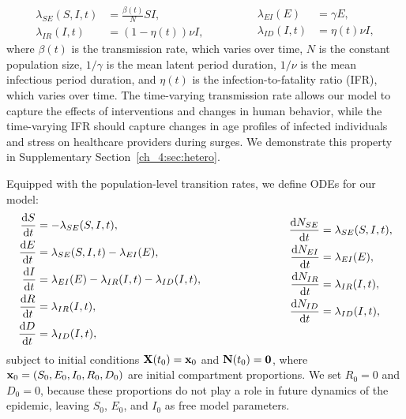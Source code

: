 \begin{equation}
\begin{aligned}
\lambda_{SE}(S, I, t) &= \frac{\beta(t)}{N} S I,\\
\lambda_{I R}(I, t) &= \left(1-\eta(t)\right) \nu I,
\end{aligned}
\qquad \quad \quad
\begin{aligned}
\lambda_{E I}(E) &= \gamma E,\\
\lambda_{I D}(I, t) &= \eta(t) \nu I,
\end{aligned}
\end{equation}
where $\beta(t)$ is the transmission rate, which varies over time, \( N \) is the constant population size, $1/\gamma$ is the mean latent period duration, $1/\nu$ is the mean infectious period duration, and $\eta(t)$ is the infection-to-fatality ratio (IFR), which varies over time.
The time-varying transmission rate allows our model to capture the effects of interventions and changes in human behavior, while the time-varying IFR should capture changes in age profiles of infected individuals and stress on healthcare providers during surges.
We demonstrate this property in Supplementary Section~\ref{ch_4:sec:hetero}.
\par
Equipped with the population-level transition rates, we define ODEs for our model:
\begin{equation}
\label{ch_4:eqn:model_ODEs}
\begin{aligned}
\frac{\mathrm{d} S}{\mathrm{d} t} &= -\lambda_{SE}(S, I, t),\\
\frac{\mathrm{d} E}{\mathrm{d} t} &= \lambda_{SE}(S, I, t)  - \lambda_{E I}(E),\\
\frac{\mathrm{d} I}{\mathrm{d} t} &=  \lambda_{E I}(E) - \lambda_{I R}(I, t) -  \lambda_{I D}(I, t),\\
\frac{\mathrm{d} R}{\mathrm{d} t} &=   \lambda_{I R}(I, t),\\
\frac{\mathrm{d} D}{\mathrm{d} t} &= \lambda_{I D}(I, t),
\end{aligned}
\qquad \qquad \qquad \qquad
\begin{aligned}
\frac{\mathrm{d} N_{SE}}{\mathrm{d} t} &= \lambda_{SE}(S, I, t),\\
\frac{\mathrm{d} N_{E I}}{\mathrm{d} t} &=  \lambda_{E I}(E),\\
\frac{\mathrm{d} N_{I R}}{\mathrm{d} t} &= \lambda_{I R}(I, t),\\
\frac{\mathrm{d} N_{I D}}{\mathrm{d} t} &= \lambda_{I D}(I, t),\\
\
\end{aligned}
\end{equation}
subject to initial conditions $ \mathbf{X}(t_0) = \mathbf{x}_0 $ and $ \mathbf{N}(t_0) = \mathbf{0}$,
where $\mathbf{x}_0 = (S_0, E_0, I_0, R_0, D_0)$ are initial compartment proportions.
We set $R_0 = 0$ and $D_0 = 0$, because these proportions do not play a role in future dynamics of the epidemic, leaving $S_0$, $E_0$, and $I_{0}$ as free model parameters.

